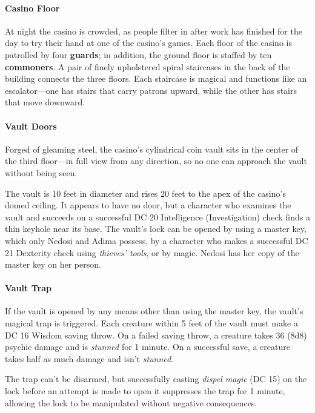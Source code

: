 \documentclass[letterpaper, 11pt, bg=full, twocolumn]{dndbook}
\begin{document}
\paragraph{Casino Floor}

At night the casino is crowded, as people filter in after work has finished for the day to try their hand at one of the casino's games. Each floor of the casino is patrolled by four \textbf{guards}; in addition, the ground floor is staffed by ten \textbf{commoners}. A pair of finely upholstered spiral staircases in the back of the building connects the three floors. Each staircase is magical and functions like an escalator---one has stairs that carry patrons upward, while the other has stairs that move downward.

\paragraph{Vault Doors}

Forged of gleaming steel, the casino's cylindrical coin vault sits in the center of the third floor---in full view from any direction, so no one can approach the vault without being seen.

The vault is 10 feet in diameter and rises 20 feet to the apex of the casino's domed ceiling. It appears to have no door, but a character who examines the vault and succeeds on a successful DC 20 Intelligence (Investigation) check finds a thin keyhole near its base. The vault's lock can be opened by using a master key, which only Nedosi and Adima possess, by a character who makes a successful DC 21 Dexterity check using \textit{thieves' tools}, or by magic. Nedosi has her copy of the master key on her person.

\paragraph{Vault Trap}

If the vault is opened by any means other than using the master key, the vault's magical trap is triggered. Each creature within 5 feet of the vault must make a DC 16 Wisdom saving throw. On a failed saving throw, a creature takes 36 (8d8) psychic damage and is \textit{stunned} for 1 minute. On a successful save, a creature takes half as much damage and isn't \textit{stunned}.

The trap can't be disarmed, but successfully casting \textit{dispel magic} (DC 15) on the lock before an attempt is made to open it suppresses the trap for 1 minute, allowing the lock to be manipulated without negative consequences.
\end{document}
